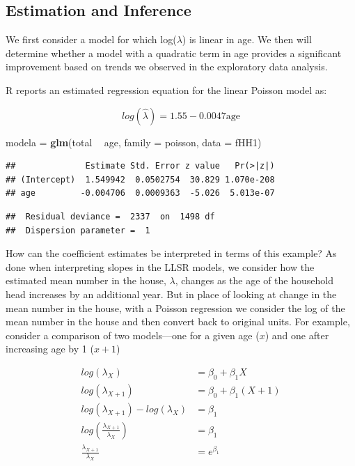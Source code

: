 \documentclass[
]{krantz}
\newenvironment{Shaded}{\begin{snugshade}}{\end{snugshade}}
\newcommand{\DataTypeTok}[1]{\textcolor[rgb]{0.27,0.27,0.27}{#1}}
\newcommand{\KeywordTok}[1]{\textcolor[rgb]{0.27,0.27,0.27}{\textbf{#1}}}
\newcommand{\NormalTok}[1]{#1}
\newcommand{\OperatorTok}[1]{\textcolor[rgb]{0.43,0.43,0.43}{\textbf{#1}}}
\newcommand{\StringTok}[1]{\textcolor[rgb]{0.5,0.5,0.5}{#1}}
\begin{document}
\hypertarget{sec-PoisInference}{%
\subsection{Estimation and Inference}\label{sec-PoisInference}}

We first consider a model for which log(\(\lambda\)) is linear in age. We then will determine whether a model with a quadratic term in age provides a significant improvement based on trends we observed in the exploratory data analysis.

R reports an estimated regression equation for the linear Poisson model as:

\begin{equation*}
log(\hat{\lambda}) = 1.55 - 0.0047 \textrm{age}
\end{equation*}

\begin{Shaded}
\begin{Highlighting}[]
\NormalTok{modela =}\StringTok{ }\KeywordTok{glm}\NormalTok{(total }\OperatorTok{~}\StringTok{ }\NormalTok{age, }\DataTypeTok{family =}\NormalTok{ poisson, }\DataTypeTok{data =}\NormalTok{ fHH1)}
\end{Highlighting}
\end{Shaded}

\begin{verbatim}
##              Estimate Std. Error z value   Pr(>|z|)
## (Intercept)  1.549942  0.0502754  30.829 1.070e-208
## age         -0.004706  0.0009363  -5.026  5.013e-07
\end{verbatim}

\begin{verbatim}
##  Residual deviance =  2337  on  1498 df 
##  Dispersion parameter =  1
\end{verbatim}

How can the coefficient estimates be interpreted in terms of this example? As done when interpreting slopes in the LLSR models, we consider how the estimated mean number in the house, \(\lambda\), changes as the age of the household head increases by an additional year. But in place of looking at change in the mean number in the house, with a Poisson regression we consider the log of the mean number in the house and then convert back to original units. For example, consider a comparison of two models---one for a given age (\(x\)) and one after increasing age by 1 (\(x+1\))

\begin{equation}
\begin{split}
log(\lambda_X) &= \beta_0 + \beta_1X \\
log(\lambda_{X+1}) &= \beta_0 + \beta_1(X+1) \\
log(\lambda_{X+1})-log(\lambda_X) &=  \beta_1 \\
log \left(\frac{\lambda_{X+1}}{\lambda_X}\right)   &= \beta_1\\
\frac{\lambda_{X+1}}{\lambda_X} &= e^{\beta_1}
\end{split}
\label{eq:rateRatio}
\end{equation}
\end{document}
